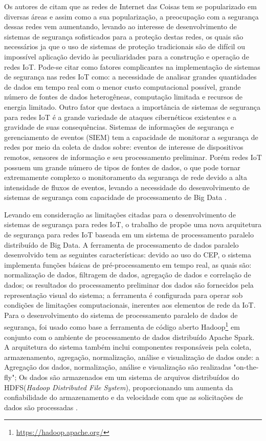 \documentclass[ti,table]{texufpel} %
\begin{document}
	Os autores de \cite{art8kotenko2017parallel} citam que as redes de Internet das Coisas tem se popularizado em diversas áreas e assim como a sua popularização, a preocupação com a segurança dessas redes vem aumentando, levando ao interesse de desenvolvimento de sistemas de segurança sofisticados para a proteção destas redes, os quais são necessários ja que o uso de sistemas de proteção tradicionais são de difícil ou impossível aplicação devido às peculiaridades para a construção e operação de redes IoT. Pode-se citar como fatores complicantes na implementação de sistemas de segurança nas redes IoT como: a necessidade de analisar grandes quantidades de dados em tempo real com o menor custo computacional possível, grande número de fontes de dados heterogêneas, computação limitada e recursos de energia limitado. Outro fator que destaca a importância de sistemas de segurança para redes IoT é a grande variedade de ataques cibernéticos existentes e a gravidade de suas consequências. Sistemas de informações de segurança e gerenciamento de eventos (SIEM) tem a capacidade de monitorar a segurança de redes por meio da coleta de dados sobre: eventos de interesse de dispositivos remotos, sensores de informação e seu processamento preliminar. Porém redes IoT possuem um grande número de tipos de fontes de dados, o que pode tornar extremamente complexo o monitoramento da segurança de rede devido a alta intensidade de fluxos de eventos, levando a necessidade do desenvolvimento de sistemas de segurança com capacidade de processamento de Big Data .
	
	Levando em consideração as limitações citadas  para o desenvolvimento de sistemas de segurança para redes IoT, o trabalho de \cite{art8kotenko2017parallel} propõe uma nova arquitetura de segurança para redes IoT baseada em um sistema de processamento paralelo distribuído de Big Data. A ferramenta de processamento de dados paralelo desenvolvido tem as seguintes características: devido ao uso do CEP, o sistema implementa funções básicas de pré-processamento em tempo real, as quais são: normalização de dados, filtragem de dados, agregação de dados e correlação de dados; os resultados do processamento preliminar dos dados são fornecidos pela representação visual do sistema; a ferramenta é configurada para operar sob condições de limitações computacionais, inerentes aos elementos de rede da IoT. Para o desenvolvimento do sistema de processamento paralelo de dados de segurança, foi usado como base a ferramenta de código aberto Hadoop\footnote{\url{https://hadoop.apache.org/}} em conjunto com o ambiente de processamento de dados distribuído Apache Spark. A arquitetura do sistema também inclui componentes responsáveis pela coleta, armazenamento, agregação, normalização, análise e visualização de dados onde: a Agregação dos dados, normalização, análise e visualização são realizadas "on-the-fly"; Os dados são armazenados em um sistema de arquivos distribuídos do HDFS(\textit{Hadoop Distributed File System}), proporcionando um aumenta da confiabilidade do armazenamento e da velocidade com que as solicitações de dados são processadas \cite{art8kotenko2017parallel}.
	
\end{document}
